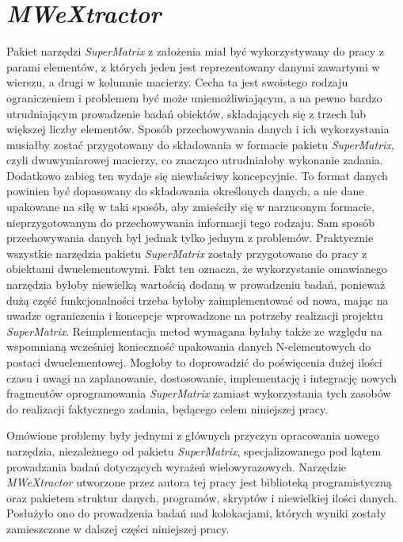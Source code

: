 \section{\protect\textit{MWeXtractor}}
Pakiet narzędzi \emph{SuperMatrix} z założenia miał być wykorzystywany do pracy z parami elementów, z których jeden jest reprezentowany danymi zawartymi w wierszu, a drugi w kolumnie macierzy.
Cecha ta jest swoistego rodzaju ograniczeniem i problemem być może uniemożliwiającym, a na pewno bardzo utrudniającym prowadzenie badań obiektów, składających się z trzech lub większej liczby elementów.
Sposób przechowywania danych i ich wykorzystania musiałby zostać przygotowany do składowania w formacie pakietu \emph{SuperMatrix}, czyli dwuwymiarowej macierzy, co znacząco utrudniałoby wykonanie zadania.
Dodatkowo zabieg ten wydaje się niewłaściwy koncepcyjnie.
To format danych powinien być dopasowany do składowania określonych danych, a nie dane upakowane na siłę w taki sposób, aby zmieściły się w narzuconym formacie, nieprzygotowanym do przechowywania informacji tego rodzaju.
Sam sposób przechowywania danych był jednak tylko jednym z problemów.
Praktycznie wszystkie narzędzia pakietu \emph{SuperMatrix} zostały przygotowane do pracy z obiektami dwuelementowymi.
Fakt ten oznacza, że wykorzystanie omawianego narzędzia byłoby niewielką wartością dodaną w prowadzeniu badań, ponieważ dużą część funkcjonalności trzeba byłoby zaimplementować od nowa, mając na uwadze ograniczenia i koncepcje wprowadzone na potrzeby realizacji projektu \emph{SuperMatrix}.
Reimplementacja metod wymagana byłaby także ze względu na wspomnianą wcześniej konieczność upakowania danych N-elementowych do postaci dwuelementowej.
Mogłoby to doprowadzić do poświęcenia dużej ilości czasu i uwagi na zaplanowanie, dostosowanie, implementację i integrację nowych fragmentów oprogramowania \emph{SuperMatrix} zamiast wykorzystania tych zasobów do realizacji faktycznego zadania, będącego celem niniejszej pracy.

\par
Omówione problemy były jednymi z głównych przyczyn opracowania nowego narzędzia, niezależnego od pakietu \emph{SuperMatrix}, specjalizowanego pod kątem prowadzania badań dotyczących wyrażeń wielowyrazowych.
Narzędzie \emph{MWeXtractor} utworzone przez autora tej pracy jest biblioteką programistyczną oraz pakietem struktur danych, programów, skryptów i niewielkiej ilości danych.
Posłużyło ono do prowadzenia badań nad kolokacjami, których wyniki zostały zamieszczone w dalszej części niniejszej pracy.

